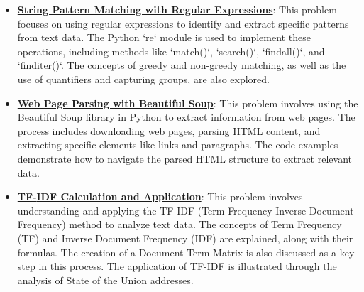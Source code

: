 \documentclass{article}%
\begin{document}
\begin{itemize}[leftmargin=*]%
\item \href{https://purdue.brightspace.com/d2l/common/assets/pdfjs-d2l-dist/1.0.14-legacy/web/viewer.html?file=\%2Fcontent\%2Fenforced\%2F1095465-WL.202510.CS24200.LE1\%2F05L1-parsing.pdf\%3Fou\%3D1095465\&lang=en-us\&container=d2l-fileviewer-rendered-pdf\&fullscreen=d2l-fileviewer-rendered-pdf-dialog\&height=667#page=2}{\textbf{String Pattern Matching with Regular Expressions}}: This problem focuses on using regular expressions to identify and extract specific patterns from text data. The Python `re` module is used to implement these operations, including methods like `match()`, `search()`, `findall()`, and `finditer()`. The concepts of greedy and non-greedy matching, as well as the use of quantifiers and capturing groups, are also explored.%
\item \href{https://purdue.brightspace.com/d2l/common/assets/pdfjs-d2l-dist/1.0.14-legacy/web/viewer.html?file=\%2Fcontent\%2Fenforced\%2F1095465-WL.202510.CS24200.LE1\%2F05L1-parsing.pdf\%3Fou\%3D1095465\&lang=en-us\&container=d2l-fileviewer-rendered-pdf\&fullscreen=d2l-fileviewer-rendered-pdf-dialog\&height=667#page=16}{\textbf{Web Page Parsing with Beautiful Soup}}: This problem involves using the Beautiful Soup library in Python to extract information from web pages. The process includes downloading web pages, parsing HTML content, and extracting specific elements like links and paragraphs. The code examples demonstrate how to navigate the parsed HTML structure to extract relevant data.%
\item \href{https://purdue.brightspace.com/d2l/common/assets/pdfjs-d2l-dist/1.0.14-legacy/web/viewer.html?file=\%2Fcontent\%2Fenforced\%2F1095465-WL.202510.CS24200.LE1\%2F05L1-parsing.pdf\%3Fou\%3D1095465\&lang=en-us\&container=d2l-fileviewer-rendered-pdf\&fullscreen=d2l-fileviewer-rendered-pdf-dialog\&height=667#page=21}{\textbf{TF{-}IDF Calculation and Application}}: This problem involves understanding and applying the TF-IDF (Term Frequency-Inverse Document Frequency) method to analyze text data. The concepts of Term Frequency (TF) and Inverse Document Frequency (IDF) are explained, along with their formulas. The creation of a Document-Term Matrix is also discussed as a key step in this process. The application of TF-IDF is illustrated through the analysis of State of the Union addresses.%
\end{itemize}%
\end{document}
